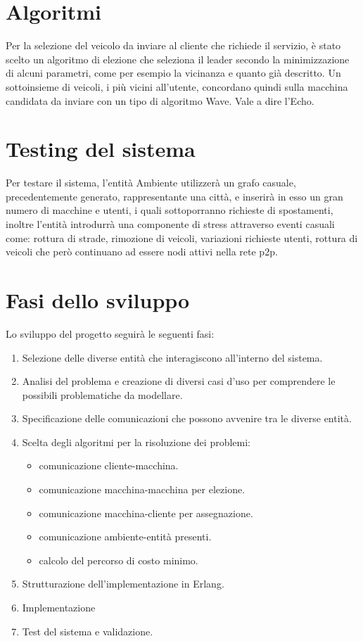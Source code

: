 \section{Algoritmi} \label{intro_algo}

Per la selezione del veicolo da inviare al cliente che richiede il servizio, è stato scelto un algoritmo di elezione che seleziona il leader secondo la minimizzazione di alcuni parametri, come per esempio la vicinanza e quanto già descritto. Un sottoinsieme di veicoli, i più vicini all'utente, concordano quindi sulla macchina candidata da inviare con un tipo di algoritmo Wave. Vale a dire l'Echo.

\section{Testing del sistema}

Per testare il sistema, l'entità Ambiente utilizzerà un grafo casuale, precedentemente generato, rappresentante una città, e inserirà in esso un gran numero di macchine e utenti, i quali sottoporranno richieste di spostamenti, inoltre l'entità introdurrà una componente di stress attraverso eventi casuali come: rottura di strade, rimozione di veicoli, variazioni richieste utenti, rottura di veicoli che però continuano ad essere nodi attivi nella rete p2p. 

\section{Fasi dello sviluppo}
Lo sviluppo del progetto seguirà le seguenti fasi:
\begin{enumerate}
	\item Selezione delle diverse entità che interagiscono all'interno del sistema.
	\item Analisi del problema e creazione di diversi casi d'uso per comprendere le possibili problematiche da modellare.
	\item Specificazione delle comunicazioni che possono avvenire tra le diverse entità.
	\item Scelta degli algoritmi per la risoluzione dei problemi: 
		\begin{itemize}
			\item comunicazione cliente-macchina.
			\item comunicazione macchina-macchina per elezione.
			\item comunicazione macchina-cliente per assegnazione.
			\item comunicazione ambiente-entità presenti.
			\item calcolo del percorso di costo minimo.
		\end{itemize}
	\item Strutturazione dell'implementazione in Erlang.
	\item Implementazione
	\item Test del sistema e validazione.
\end{enumerate}

